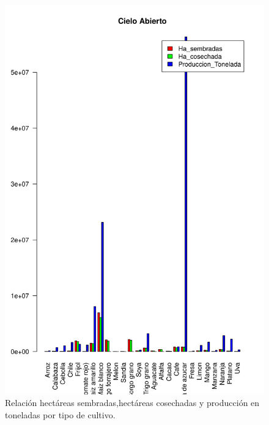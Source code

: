 \documentclass{article}
\begin{document}
\begin{figure}[ht]
\centering
\includegraphics[scale=.5]{Tablas_Cielo_Abierto.png}
\caption{Relación hectáreas sembradas,hectáreas cosechadas y producción en toneladas por tipo de cultivo.}
\label{fig:Cielo_abierto}
\end{figure}
\end{document}
